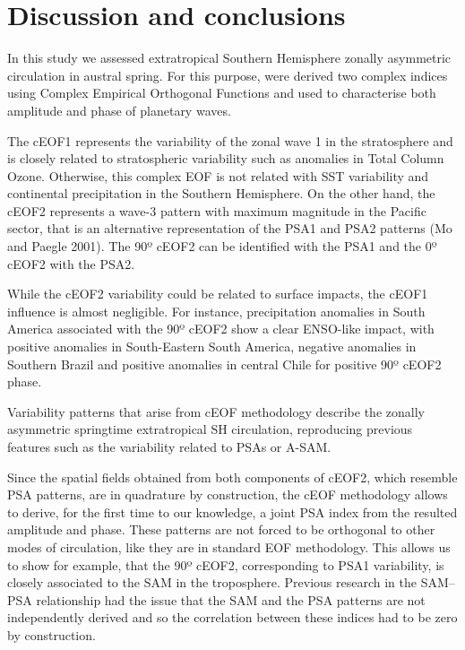 \documentclass[pdflatex,sn-basic]{sn-jnl}
\theoremstyle{thmstyleone}%
\theoremstyle{thmstyletwo}%
\theoremstyle{thmstylethree}%
\begin{document}
\hypertarget{discussion}{%
\section{Discussion and conclusions}\label{discussion}}

In this study we assessed extratropical Southern Hemisphere zonally asymmetric circulation in austral spring.
For this purpose, were derived two complex indices using Complex Empirical Orthogonal Functions and used to characterise both amplitude and phase of planetary waves.

The cEOF1 represents the variability of the zonal wave 1 in the stratosphere and is closely related to stratospheric variability such as anomalies in Total Column Ozone.
Otherwise, this complex EOF is not related with SST variability and continental precipitation in the Southern Hemisphere.
On the other hand, the cEOF2 represents a wave-3 pattern with maximum magnitude in the Pacific sector, that is an alternative representation of the PSA1 and PSA2 patterns (Mo and Paegle 2001).
The 90º cEOF2 can be identified with the PSA1 and the 0º cEOF2 with the PSA2.

While the cEOF2 variability could be related to surface impacts, the cEOF1 influence is almost negligible.
For instance, precipitation anomalies in South America associated with the 90º cEOF2 show a clear ENSO-like impact, with positive anomalies in South-Eastern South America, negative anomalies in Southern Brazil and positive anomalies in central Chile for positive 90º cEOF2 phase.

Variability patterns that arise from cEOF methodology describe the zonally asymmetric springtime extratropical SH circulation, reproducing previous features such as the variability related to PSAs or A-SAM.

Since the spatial fields obtained from both components of cEOF2, which resemble PSA patterns, are in quadrature by construction, the cEOF methodology allows to derive, for the first time to our knowledge, a joint PSA index from the resulted amplitude and phase.
These patterns are not forced to be orthogonal to other modes of circulation, like they are in standard EOF methodology.
This allows us to show for example, that the 90º cEOF2, corresponding to PSA1 variability, is closely associated to the SAM in the troposphere.
Previous research in the SAM--PSA relationship had the issue that the SAM and the PSA patterns are not independently derived and so the correlation between these indices had to be zero by construction.
\end{document}
